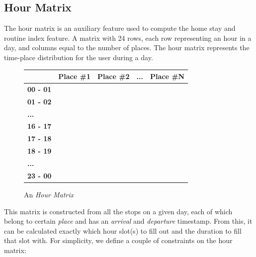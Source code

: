 \subsection{Hour Matrix}
\label{sub:hour-matrix}
The hour matrix is an auxiliary feature used to compute the home stay and routine index feature. A matrix with 24 rows, each row representing an hour in a day, and columns equal to the number of places. The hour matrix represents the time-place distribution for the user during a day.
\begin{figure}
    \centering
    \begin{tabular}{|l|l|l|l|l|}
    \hline
    \textbf{}        & \textbf{Place \#1} & \textbf{Place \#2} & \textbf{...} & \textbf{Place \#N} \\ \hline
    \textbf{00 - 01} &                    &                    &              &                    \\ \hline
    \textbf{01 - 02} &                    &                    &              &                    \\ \hline
    \textbf{...}     &                    &                    &              &                    \\ \hline
    \textbf{16 - 17} &                    &                    &              &                    \\ \hline
    \textbf{17 - 18} &                    &                    &              &                    \\ \hline
    \textbf{18 - 19} &                    &                    &              &                    \\ \hline
    \textbf{...}     &                    &                    &              &                    \\ \hline
    \textbf{23 - 00} &                    &                    &              &                    \\ \hline
    \end{tabular}
    \caption{An \textit{Hour Matrix}}
    \label{fig:time-table}
\end{figure}

This matrix is constructed from all the stops on a given day, each of which belong to certain \textit{place} and has an \textit{arrival} and \textit{departure} timestamp. From this, it can be calculated exactly which hour slot(s) to fill out and the duration to fill that slot with. For simplicity, we define a couple of constraints on the hour matrix:

